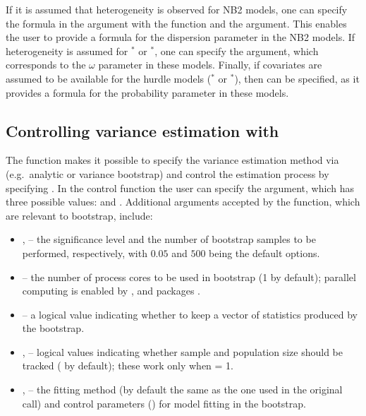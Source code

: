\documentclass[
]{jss}
\newcommand{\1}{\mathcal{I}} \newcommand{\bZero}{\boldsymbol{0}}
\begin{document}
If it is assumed that heterogeneity is observed for NB2 models, one can
specify the formula in the  argument with the
 function and the  argument. This
enables the user to provide a formula for the dispersion parameter in
the NB2 models. If heterogeneity is assumed for \(^\ast\) or
\(^\ast\), one can specify the  argument,
which corresponds to the \(\omega\) parameter in these models. Finally,
if covariates are assumed to be available for the hurdle models
(\(^\ast\) or \(^\ast\)), then
 can be specified, as it provides a formula for the
probability parameter in these models.

\subsection[Controlling variance estimation with controlPopVar]{Controlling variance estimation with }

The  function makes it possible to specify the
variance estimation method via  (e.g.~analytic or variance
bootstrap) and control the estimation process by specifying
. In the control function  the
user can specify the  argument, which has three possible
values:  and
. Additional arguments accepted by the
 function, which are relevant to bootstrap, include:

\begin{itemize}
  \item {},  -- the significance level and the number of bootstrap samples to be performed, respectively, with $0.05$ and $500$ being the default options.
  \item {} -- the number of process cores to be used in bootstrap (1 by default); parallel computing is enabled by  \citep{doParallel},  \citep{foreach} and  packages \citep{parallel}.
  \item {} -- a logical value indicating whether to keep a vector of statistics produced by the bootstrap.
  \item {},  --  logical values indicating whether sample and population size should be tracked ( by default); these work only when  = 1.
    \item {},  -- the fitting method (by default the same as the one used in the original call) and control parameters () for model fitting in the bootstrap.
\end{itemize}
\end{document}

